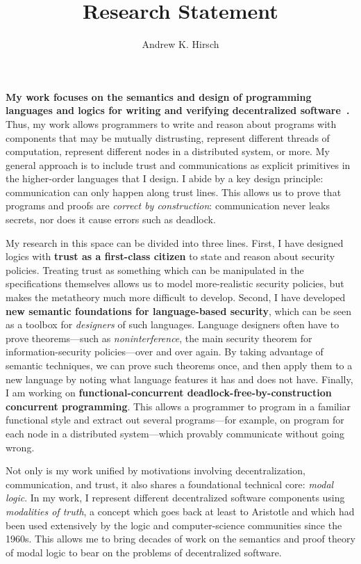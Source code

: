 \documentclass{article}
\author{Andrew K. Hirsch}
\title{Research Statement}
\date{}
\theoremstyle{definition}
\begin{document}
\maketitle

\textbf{My work focuses on the semantics and design of programming languages and logics for writing and verifying decentralized software~\citep{SilverHHCZ22,MenzHLG22,HirschG22,HirschC21,HirschACAT20,HirschT18,HirschC13}.}
Thus, my work allows programmers to write and reason about programs with components that may be mutually distrusting, represent different threads of computation, represent different nodes in a distributed system, or more.
My general approach is to include trust and communications as explicit primitives in the higher-order languages that I design.
I abide by a key design principle: communication can only happen along trust lines.
This allows us to prove that programs and proofs are \emph{correct by construction}: communication never leaks secrets, nor does it cause errors such as deadlock.

My research in this space can be divided into three lines.
First, I have designed logics with \textbf{trust as a first-class citizen} to state and reason about security policies.
Treating trust as something which can be manipulated in the specifications themselves allows us to model more-realistic security policies, but makes the metatheory much more difficult to develop.
Second, I have developed \textbf{new semantic foundations for language-based security}, which can be seen as a toolbox for \emph{designers} of such languages.
Language designers often have to prove theorems---such as \emph{noninterference}, the main security theorem for information-security policies---over and over again.
By taking advantage of semantic techniques, we can prove such theorems once, and then apply them to a new language by noting what language features it has and does not have.
Finally, I am working on \textbf{functional-concurrent deadlock-free-by-construction concurrent programming}.
This allows a programmer to program in a familiar functional style and extract out several programs---for example, on program for each node in a distributed system---which provably communicate without going wrong.

Not only is my work unified by motivations involving decentralization, communication, and trust, it also shares a foundational technical core: \emph{modal logic}.
In my work, I represent different decentralized software components using \emph{modalities of truth}, a concept which goes back at least to Aristotle and which had been used extensively by the logic and computer-science communities since the 1960s.
This allows me to bring decades of work on the semantics and proof theory of modal logic to bear on the problems of decentralized software.
\end{document}
